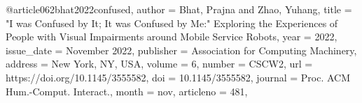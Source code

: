 @article{062bhat2022confused,
author = {Bhat, Prajna and Zhao, Yuhang},
title = {"I was Confused by It; It was Confused by Me:" Exploring the Experiences of People with Visual Impairments around Mobile Service Robots},
year = {2022},
issue_date = {November 2022},
publisher = {Association for Computing Machinery},
address = {New York, NY, USA},
volume = {6},
number = {CSCW2},
url = {https://doi.org/10.1145/3555582},
doi = {10.1145/3555582},
journal = {Proc. ACM Hum.-Comput. Interact.},
month = {nov},
articleno = {481},
}